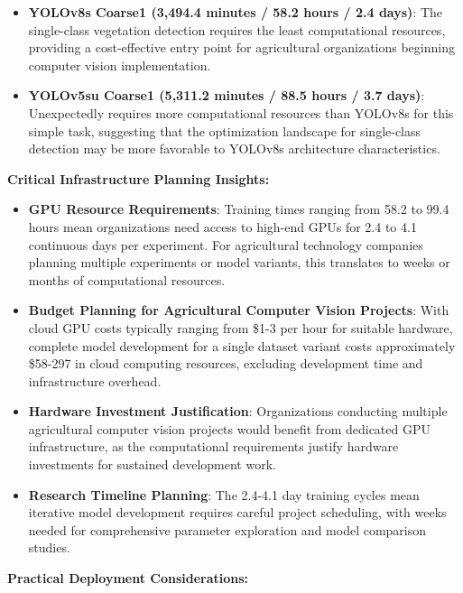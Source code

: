 \begin{itemize}
    \item \textbf{YOLOv8s Coarse1 (3,494.4 minutes / 58.2 hours / 2.4 days)}: The single-class vegetation detection requires the least computational resources, providing a cost-effective entry point for agricultural organizations beginning computer vision implementation.
    
    \item \textbf{YOLOv5su Coarse1 (5,311.2 minutes / 88.5 hours / 3.7 days)}: Unexpectedly requires more computational resources than YOLOv8s for this simple task, suggesting that the optimization landscape for single-class detection may be more favorable to YOLOv8s architecture characteristics.
\end{itemize}

\textbf{Critical Infrastructure Planning Insights:}

\begin{itemize}
    \item \textbf{GPU Resource Requirements}: Training times ranging from 58.2 to 99.4 hours mean organizations need access to high-end GPUs for 2.4 to 4.1 continuous days per experiment. For agricultural technology companies planning multiple experiments or model variants, this translates to weeks or months of computational resources.
    
    \item \textbf{Budget Planning for Agricultural Computer Vision Projects}: With cloud GPU costs typically ranging from \$1-3 per hour for suitable hardware, complete model development for a single dataset variant costs approximately \$58-297 in cloud computing resources, excluding development time and infrastructure overhead.
    
    \item \textbf{Hardware Investment Justification}: Organizations conducting multiple agricultural computer vision projects would benefit from dedicated GPU infrastructure, as the computational requirements justify hardware investments for sustained development work.
    
    \item \textbf{Research Timeline Planning}: The 2.4-4.1 day training cycles mean iterative model development requires careful project scheduling, with weeks needed for comprehensive parameter exploration and model comparison studies.
\end{itemize}

\textbf{Practical Deployment Considerations:}

